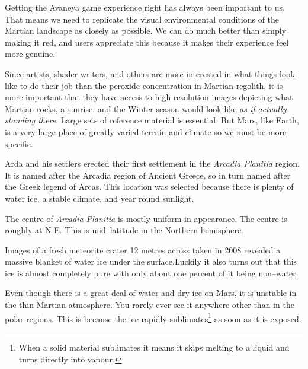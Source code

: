 


    {}
Getting the Avaneya game experience right has always been important to us. That means we need to replicate the visual environmental conditions of the Martian landscape as closely as possible. We can do much better than simply making it red, and users appreciate this because it makes their experience feel more genuine.

Since artists, shader writers, and others are more interested in what things look like to do their job than the peroxide concentration in Martian regolith, it is more important that they have access to high resolution images depicting what Martian rocks, a sunrise, and the Winter season would look like {\it as if actually standing there}. Large sets of reference material is essential. But Mars, like Earth, is a very large place of greatly varied terrain and climate so we must be more specific.

Arda and his settlers erected their first settlement in the {\it Arcadia Planitia} region. It is named after the Arcadia region of Ancient Greece, so in turn named after the Greek legend of Arcas. This location was selected because there is plenty of water ice, a stable climate, and year round sunlight.

The centre of {\it Arcadia Planitia} is mostly uniform in appearance. The centre is roughly at N E. This is mid--latitude in the Northern hemisphere. 

Images of a fresh meteorite crater 12 metres across taken in 2008 revealed a massive blanket of water ice under the surface. Luckily it also turns out that this ice is almost completely pure with only about one percent of it being non--water.

Even though there is a great deal of water and dry ice on Mars, it is unstable in the thin Martian atmosphere. You rarely ever see it anywhere other than in the polar regions. This is because the ice rapidly sublimates\footnote{When a solid material sublimates it means it skips melting to a liquid and turns directly into vapour.} as soon as it is exposed.

